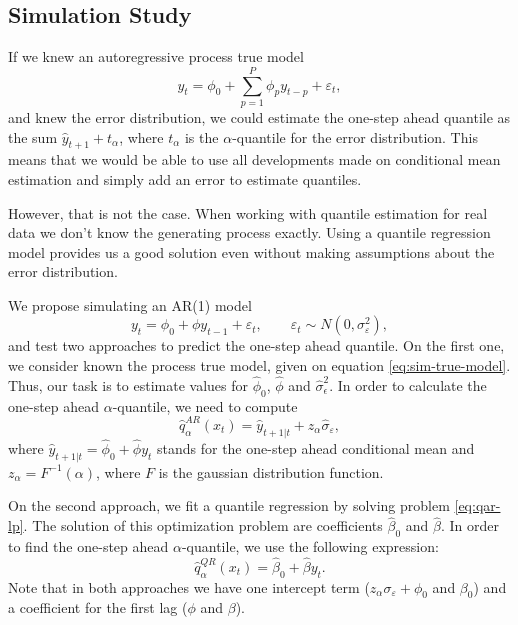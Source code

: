 

\subsection{Simulation Study}
\label{sec:simulation-ar1}
If we knew an autoregressive process true model
\[
y_t = \phi_0 + \sum_{p=1}^{P} \phi_p y_{t-p} + \varepsilon_t,
\]
and knew the error distribution, we could estimate the one-step ahead quantile as the sum $\hat{y}_{t+1} + t_{\alpha}$, where $t_\alpha$ is the $\alpha$-quantile for the error distribution. This means that we would be able to use all developments made on conditional mean estimation and simply add an error to estimate quantiles. 

However, that is not the case. When working with quantile estimation for real data we don't know the generating process exactly. Using a quantile regression model provides us a good solution even without making assumptions about the error distribution. 

We propose simulating an AR(1) model
\begin{equation}
y_t = \phi_0 +  \phi y_{t-1} + \varepsilon_t,\qquad \varepsilon_t \sim N(0, \sigma_\varepsilon^2),	
\label{eq:sim-true-model}
\end{equation}
and test two approaches to predict the one-step ahead quantile. On the first one, we consider known the process true model, given on equation \ref{eq:sim-true-model}. Thus, our task is to estimate values for $\hat{\phi}_0$, $\hat{\phi}$ and $\hat{\sigma}_\epsilon^2$. In order to calculate the one-step ahead $\alpha$-quantile, we need to compute
\begin{equation}
\hat{q}^{AR}_\alpha(x_t) = \hat{y}_{t+1|t} + z_\alpha \hat{\sigma}_\varepsilon,
\end{equation}
where $\hat{y}_{t+1|t} = \hat{\phi}_0 + \hat{\phi} y_{t}$ stands for the one-step ahead conditional mean and $z_\alpha = F^{-1}(\alpha)$, where $F$ is the gaussian distribution function.

On the second approach, we fit a quantile regression by solving problem \ref{eq:qar-lp}. The solution of this optimization problem are coefficients $\hat{\beta}_0$ and $\hat{\beta}$. In order to find the one-step ahead $\alpha$-quantile, we use the following expression:
\begin{equation}
\hat{q}^{QR}_\alpha(x_t) = \hat{\beta}_0 + \hat{\beta} y_{t}.
\end{equation}
Note that in both approaches we have one intercept term ($z_\alpha \sigma_\varepsilon + {\phi}_0$ and $\beta_0$) and a coefficient for the first lag ($\phi$ and $\beta$). 

